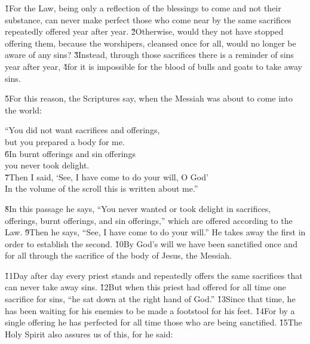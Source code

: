 \v{1}For the Law, being only a reflection of the blessings to come and not their substance, can never make perfect those who come near by the same sacrifices repeatedly offered year after year. \v{2}Otherwise, would they not have stopped offering them, because the worshipers, cleansed once for all, would no longer be aware of any sins? \v{3}Instead, through those sacrifices there is a reminder of sins year after year, \v{4}for it is impossible for the blood of bulls and goats to take away sins.

\v{5}For this reason, the Scriptures say, when the Messiah was about to come into the world:

\begin{poetry}
\poeml ``You did not want sacrifices and offerings, \\
\poemll    but you prepared a body for me. \\
\poeml \v{6}In burnt offerings and sin offerings \\
\poemll    you never took delight. \\
\poeml \v{7}Then I said, `See, I have come to do your will, O God' \\
\poemll    In the volume of the scroll this is written about me.''
\end{poetry}

\v{8}In this passage he says, ``You never wanted or took delight in sacrifices, offerings, burnt offerings, and sin offerings,'' which are offered according to the Law. \v{9}Then he says, ``See, I have come to do your will.'' He takes away the first in order to establish the second. \v{10}By God's will we have been sanctified once and for all through the sacrifice of the body of Jesus, the Messiah.

\v{11}Day after day every priest stands and repeatedly offers the same sacrifices that can never take away sins. \v{12}But when this priest had offered for all time one sacrifice for sins, ``he sat down at the right hand of God.'' \v{13}Since that time, he has been waiting for his enemies to be made a footstool for his feet. \v{14}For by a single offering he has perfected for all time those who are being sanctified. \v{15}The Holy Spirit also assures us of this, for he said:

